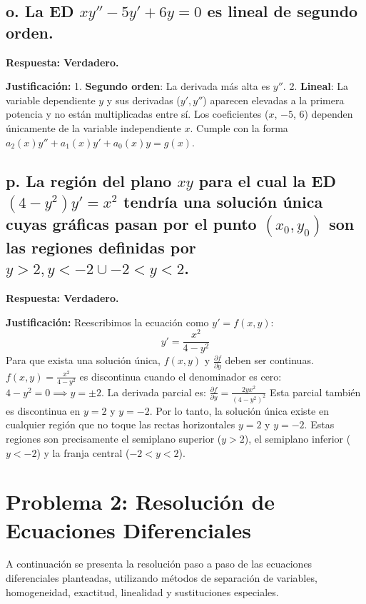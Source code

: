 \documentclass[a4paper]{article}
\begin{document}
\subsection*{o. La ED $xy'' - 5y' + 6y = 0$ es lineal de segundo orden.}

\textbf{Respuesta: Verdadero.}

\textbf{Justificación:}
1. \textbf{Segundo orden}: La derivada más alta es $y''$.
2. \textbf{Lineal}: La variable dependiente $y$ y sus derivadas ($y', y''$) aparecen elevadas a la primera potencia y no están multiplicadas entre sí. Los coeficientes ($x$, $-5$, $6$) dependen únicamente de la variable independiente $x$. Cumple con la forma $a_2(x)y'' + a_1(x)y' + a_0(x)y = g(x)$.

\subsection*{p. La región del plano $xy$ para el cual la ED $(4 - y^2)y' = x^2$ tendría una solución única cuyas gráficas pasan por el punto $(x_0, y_0)$ son las regiones definidas por $y > 2, y < -2 \cup -2 < y < 2$.}

\textbf{Respuesta: Verdadero.}

\textbf{Justificación:}
Reescribimos la ecuación como $y' = f(x, y)$:
$$y' = \frac{x^2}{4 - y^2}$$
Para que exista una solución única, $f(x, y)$ y $\frac{\partial f}{\partial y}$ deben ser continuas.
$f(x, y) = \frac{x^2}{4 - y^2}$ es discontinua cuando el denominador es cero: $4 - y^2 = 0 \implies y = \pm 2$.
La derivada parcial es:
$\frac{\partial f}{\partial y} = \frac{2yx^2}{(4-y^2)^2}$
Esta parcial también es discontinua en $y = 2$ y $y = -2$.
Por lo tanto, la solución única existe en cualquier región que no toque las rectas horizontales $y = 2$ y $y = -2$. Estas regiones son precisamente el semiplano superior ($y > 2$), el semiplano inferior ($y < -2$) y la franja central ($-2 < y < 2$).

\section*{Problema 2: Resolución de Ecuaciones Diferenciales}

A continuación se presenta la resolución paso a paso de las ecuaciones diferenciales planteadas, utilizando métodos de separación de variables, homogeneidad, exactitud, linealidad y sustituciones especiales.
\end{document}
